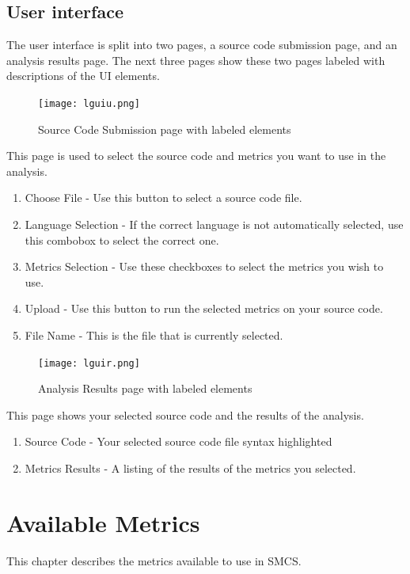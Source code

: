\documentclass{scrreprt}
\begin{document}
	\section{User interface}
	The user interface is split into two pages, a source code submission page, and an analysis results page. The next three pages show these two pages labeled with descriptions of the UI elements.
	
	\begin{figure}[H]
		\centering
		\texttt{[image: lguiu.png]}
		\caption{Source Code Submission page with labeled elements}
	\end{figure}
	
	This page is used to select the source code and metrics you want to use in the analysis.
	
	\begin{enumerate}
		\item Choose File - Use this button to select a source code file.
		\item Language Selection - If the correct language is not automatically selected, use this combobox to select the correct one.
		\item Metrics Selection - Use these checkboxes to select the metrics you wish to use.
		\item Upload - Use this button to run the selected metrics on your source code.
		\item File Name - This is the file that is currently selected.
	\end{enumerate}
	
	\begin{figure}[H]
		\centering
		\texttt{[image: lguir.png]}
		\caption{Analysis Results page with labeled elements}
	\end{figure}
	
	This page shows your selected source code and the results of the analysis.
	
	\begin{enumerate}
		\item Source Code - Your selected source code file syntax highlighted
		\item Metrics Results - A listing of the results of the metrics you selected.
	\end{enumerate}
	

	{\let\clearpage\relax \chapter{Available Metrics}}
	This chapter describes the metrics available to use in SMCS.
	
\end{document}
